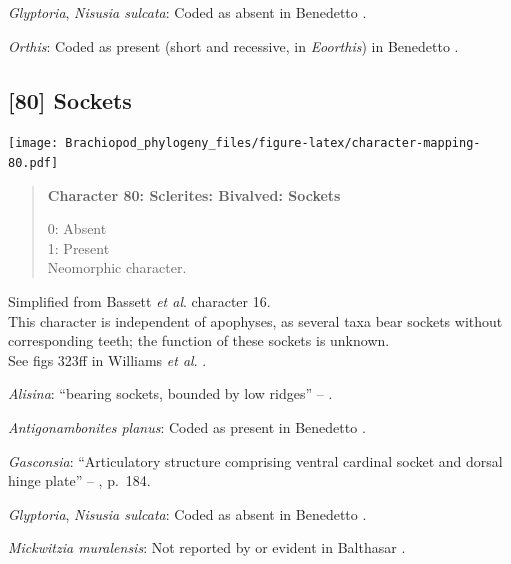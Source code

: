 \documentclass[openany]{book}
\begin{document}
\hypertarget{Glyptoria-coding-79}{}
\emph{Glyptoria}, \emph{Nisusia sulcata}: Coded as absent in Benedetto
\citeyearpar{Benedetto2009iChaniella}.

\hypertarget{Orthis-coding-79}{}
\emph{Orthis}: Coded as present (short and recessive, in
\emph{Eoorthis}) in Benedetto \citeyearpar{Benedetto2009iChaniella}.

\subsection*{{[}80{]} Sockets}\label{sockets}

\texttt{[image: Brachiopod\_phylogeny\_files/figure-latex/character-mapping-80.pdf]}

\begin{quote}
\textbf{Character 80: Sclerites: Bivalved: Sockets}

0: Absent\\
1: Present\\
Neomorphic character.
\end{quote}

Simplified from Bassett \emph{et al}.
\citeyearpar{Bassett2001Functionalmorphology} character 16.\\
This character is independent of apophyses, as several taxa bear sockets
without corresponding teeth; the function of these sockets is unknown.\\
See figs 323ff in Williams \emph{et al}.
\citeyearpar{Williams1997Introduction}.

\hypertarget{Alisina-coding-80}{}
\emph{Alisina}: ``bearing sockets, bounded by low ridges'' --
\citet{Williams2000LinguliformeaCraniiformea}.

\hypertarget{Antigonambonites_planus-coding-80}{}
\emph{Antigonambonites planus}: Coded as present in Benedetto
\citeyearpar{Benedetto2009iChaniella}.

\hypertarget{Gasconsia-coding-80}{}
\emph{Gasconsia}: ``Articulatory structure comprising ventral cardinal
socket and dorsal hinge plate'' --
\citet{Williams2000LinguliformeaCraniiformea}, p.~184.

\hypertarget{Glyptoria-coding-80}{}
\emph{Glyptoria}, \emph{Nisusia sulcata}: Coded as absent in Benedetto
\citeyearpar{Benedetto2009iChaniella}.

\hypertarget{Mickwitzia_muralensis-coding-80}{}
\emph{Mickwitzia muralensis}: Not reported by or evident in Balthasar
\citeyearpar{Balthasar2004Shellstructure}.
\end{document}
